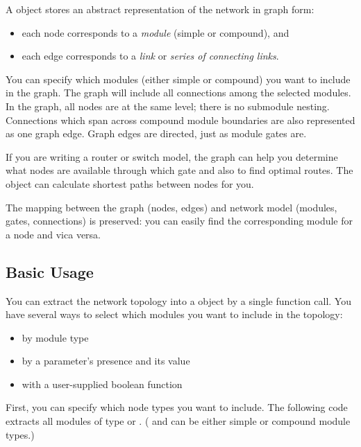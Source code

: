A  object stores an abstract representation of the
network in graph form:
\begin{itemize}
  \item{each  node corresponds to a \textit{module}
    (simple or compound), and}
  \item{each  edge corresponds to a \textit{link} or
    \textit{series of connecting links}.}
\end{itemize}

You can specify which modules (either simple or compound) you want to
include in the graph. The graph will include all connections among the
selected modules. In the graph, all nodes are at the same level;
there is no submodule nesting.  Connections which span across compound
module boundaries are also represented as one graph edge. Graph edges
are directed, just as module gates are.


If you are writing a router or switch model, the 
graph can help you determine what nodes are available through which
gate and also to find optimal routes. The
 object can calculate shortest paths between nodes for you.

The mapping between the graph (nodes, edges) and network model
(modules, gates, connections) is preserved: you can easily find
the corresponding module for a  node and vica versa.





\subsection{Basic Usage}

You can extract the network topology into a 
object by a single function call. You have several ways to select
which modules you want to include in the topology:
\begin{itemize}
  \item{by module type}
  \item{by a parameter's presence and its value}
  \item{with a user-supplied boolean function}
\end{itemize}

First, you can specify which node types you want to include. The
following code extracts all modules of type  or .
( and  can be either simple or compound module types.)

